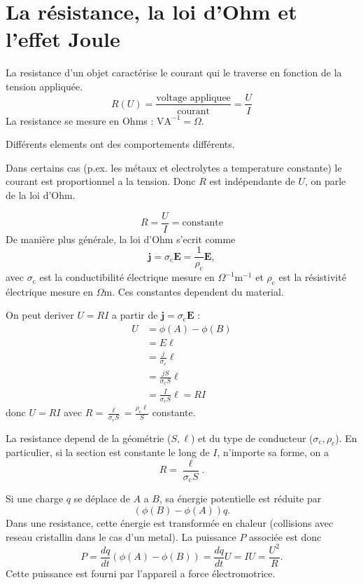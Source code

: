 \section{La résistance, la loi d'Ohm et l'effet Joule}
\begin{definition}
La resistance d'un objet caractérise le courant qui le traverse en fonction de la tension appliquée.
$$
R(U)=\frac{\text{voltage appliquee}}{\text{courant}}=\frac{U}{I}
$$
La resistance se mesure en Ohms : $\mathrm{VA}^{-1}=\Omega$.
\end{definition}
\begin{remark}
Différents elements ont des comportements différents.
\end{remark}
Dans certains cas (p.ex. les métaux et electrolytes a temperature constante) le courant est proportionnel a la tension. Donc $R$ est indépendante de $U$, on parle de la loi d'Ohm.
\begin{theorem}
$$
R=\frac{U}{I}=\mathrm{constante}
$$
De manière plus générale, la loi d'Ohm s'ecrit comme
$$
\boldsymbol{j}=\sigma _{\mathrm{c}}\boldsymbol{E}=\frac{1}{\rho _{\mathrm{c}}}\boldsymbol{E},
$$
avec $\sigma _{\mathrm{c}}$ est la conductibilité électrique mesure en $\Omega ^{-1}\mathrm{m}^{-1}$ et $\rho _{\mathrm{c}}$ est la résistivité électrique mesure en $\Omega \mathrm{m}$. Ces constantes dependent du material.
\end{theorem}
\begin{remark}
On peut deriver $U=RI$ a partir de $\boldsymbol{j}=\sigma _{\mathrm{c}}\boldsymbol{E}$ : 
\begin{align*}
U & =\phi(A)-\phi(B) \\
 & =E\ell \\
 & =\frac{j}{\sigma _{\mathrm{c}}}\ell \\
 & =\frac{jS}{\sigma _{\mathrm{c}}S }\ell \\
 & =\frac{I}{\sigma _{\mathrm{c}}S }\ell=RI
\end{align*}
donc $U=RI$ avec $R=\frac{\ell}{\sigma _{\mathrm{c}}S}=\frac{\rho _{\mathrm{c}}\ell}{S}$ constante.

La resistance depend de la géométrie ($S,\ell$) et du type de conducteur ($\sigma _{\mathrm{c}}, \rho _{\mathrm{c}}$). En particulier, si la section est constante le long de $I$, n'importe sa forme, on a
$$
R=\frac{\ell}{\sigma _{\mathrm{c}}S}.
$$
\end{remark}
\begin{theorem}
Si une charge $q$ se déplace de $A$ a $B$, sa énergie potentielle est réduite par 
$$
(\phi(B)-\phi (A))q.
$$
Dans une resistance, cette énergie est transformée en chaleur (collisions avec reseau cristallin dans le cas d'un metal). La puissance $P$ associée est donc 
$$
P=\frac{dq}{dt}(\phi(A)-\phi(B))=\frac{dq}{dt}U=IU=\frac{U^{2}}{R}.
$$
Cette puissance est fourni par l'appareil a force électromotrice.
\end{theorem}
